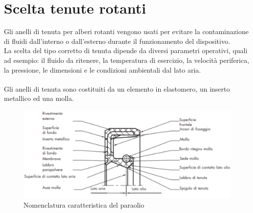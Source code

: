 \section{Scelta tenute rotanti}
Gli anelli di tenuta per alberi rotanti vengono usati per evitare la contaminazione di fluidi dall'interno o dall'esterno durante il funzionamento del dispositivo.\\
La scelta del tipo corretto di tenuta dipende da diversi parametri operativi, quali ad esempio: il fluido da ritenere, la temperatura di esercizio, la velocità periferica, la pressione, le dimensioni e le condizioni ambientali dal lato aria.\\
\\
Gli anelli di tenuta sono costituiti da un elemento in elastomero, un inserto metallico ed una molla. 
\begin{figure}[h]
    \centering
    \includegraphics[scale=0.5]{Immagini/SchemaParaolio.png}
    \caption{Nomenclatura caratteristica del paraolio}
    \label{fig:SchemaParaolio}
\end{figure}

